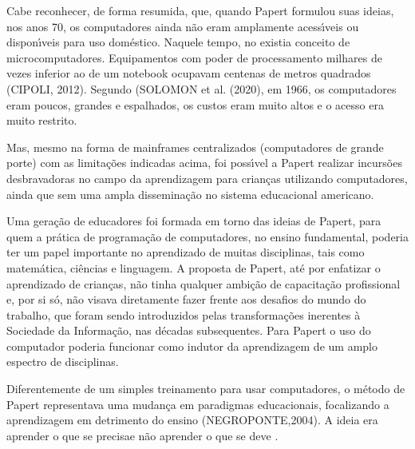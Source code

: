 \documentclass[
12pt,		%
openright,	%
twoside,  %
a4paper,			%
chapter=TITLE,		%
english,			%
french,				%
spanish,			%
brazil				%
]{USPSC-classe/USPSC}
\begin{document}
Cabe reconhecer, de forma resumida, que, quando Papert formulou suas ideias, nos anos 70, os computadores ainda n\~ao eram amplamente acess\'{\i}veis ou dispon\'{\i}veis para uso dom\'estico. Naquele tempo, no existia conceito de \textquotedbl microcomputadores\textquotedbl . Equipamentos com poder de processamento milhares de vezes inferior ao de um notebook ocupavam centenas de metros quadrados (CIPOLI, 2012). Segundo (SOLOMON et al. (2020), \textquotedbl em 1966, os computadores eram poucos, grandes e espalhados\textquotedbl , os custos eram muito altos e o acesso era muito restrito.









Mas, mesmo na forma de mainframes centralizados (computadores de grande porte) com as limita\c{c}\~oes indicadas acima, foi poss\'{\i}vel a Papert realizar incurs\~oes desbravadoras no campo da aprendizagem para crian\c{c}as utilizando computadores, ainda que sem uma ampla dissemina\c{c}\~ao no sistema educacional americano.









Uma gera\c{c}\~ao de educadores foi formada em torno das ideias de Papert, para quem a pr\'atica de programa\c{c}\~ao de computadores, no ensino fundamental, poderia ter um papel importante no aprendizado de muitas disciplinas, tais como matem\'atica, ci\^encias e linguagem. A proposta de Papert, at\'e por enfatizar o aprendizado de crian\c{c}as, n\~ao tinha qualquer ambi\c{c}\~ao de capacita\c{c}\~ao profissional e, por si s\'o, n\~ao visava diretamente fazer frente aos desafios do \textquotedbl mundo do trabalho\textquotedbl , que foram sendo introduzidos pelas transforma\c{c}\~oes inerentes \`a Sociedade da Informa\c{c}\~ao, nas d\'ecadas subsequentes. Para Papert o uso do computador poderia funcionar como indutor da aprendizagem de um amplo espectro de disciplinas.









Diferentemente de um simples treinamento para usar computadores, o m\'etodo de Papert representava uma mudan\c{c}a em paradigmas educacionais, focalizando a aprendizagem em detrimento do ensino  (NEGROPONTE,2004). A ideia era \textquotedbl  aprender o que se precisa\textquotedbl  e n\~ao \textquotedbl aprender o que se deve \textquotedbl .
\end{document}

